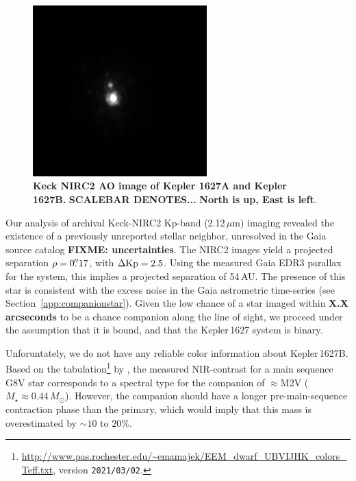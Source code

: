 \documentclass[12pt,modern,tighten]{aastex63}
\begin{document}
\begin{figure}[t]
	\begin{center}
		\leavevmode
		\includegraphics[width=0.6\textwidth]{TEMP_binarity_ao.png}
	\end{center}
	\vspace{-0.7cm}
	\caption{
    {\bf Keck NIRC2 AO image of Kepler 1627A and Kepler 1627B.}  
    {\bf SCALEBAR DENOTES...}
    {\bf North is up, East is left}.
    \label{fig:ao}
	}
\end{figure}

Our analysis of archival Keck-NIRC2 Kp-band (2.12\,$\mu $m) imaging
revealed the existence of a previously unreported stellar neighbor,
unresolved in the Gaia source catalog {\bf FIXME: uncertainties}.  The
NIRC2 images yield a projected separation $\rho=0\mbox{$.\!\!^{\prime\prime}$}17$, with
$\Delta {\rm Kp} = 2.5$.  Using the measured Gaia EDR3 parallax for
the system, this implies a projected separation of 54\,AU.  The
presence of this star is consistent with the excess noise in the Gaia
astrometric time-series (see Section~\ref{app:companionstar}).  Given
the low chance of a star imaged within {\bf X.X arcseconds} to be a
chance companion along the line of sight, we proceed under the
assumption that it is bound, and that the Kepler\,1627 system is
binary.

Unforuntately, we do not have any reliable color information about
Kepler\,1627B.  Based on the
tabulation\footnote{\url{http://www.pas.rochester.edu/~emamajek/EEM_dwarf_UBVIJHK_colors_Teff.txt},
version \texttt{2021/03/02}.} by \citet{pecaut_mamajek_2013}, the
measured NIR-contrast for a main sequence G8V star corresponds to a
spectral type for the companion of $\approx$M2V ($M_\star \approx
0.44\,M_\odot$).  However, the companion should have a longer
pre-main-sequence contraction phase than the primary, which would
imply that this mass is overestimated by $\sim10$ to $20\%$.
\end{document}
